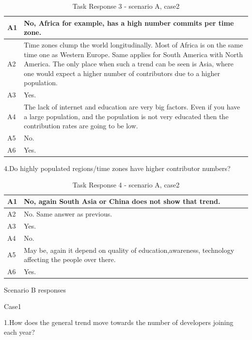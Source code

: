 \documentclass[double,12pt]{beavtex}
\begin{document}
\begin{appendices}
\begin{table}[H]
\begin{tabular}{ |p{2cm}|p{12cm}| }
 \hline
 A1 & No, Africa for example, has a high number commits per time zone.\\
 \hline
 A2 & Time zones clump the world longitudinally. Most of Africa is on the same time one as Western Europe. Same applies for South America with North America. The only place when such a trend can be seen is Asia, where one would expect a higher number of contributors due to a higher population.\\ \hline
 A3 & Yes.\\ \hline
 A4 & The lack of internet and education are very big factors. Even if you have a large population, and the population is not very educated then the contribution rates are going to be low.\\ \hline
 A5 & No.\\ \hline
 A6 & Yes.\\
 \hline
\end{tabular}
\caption{Task Response 3 - scenario A, case2}
\label{tab:table13}
\end{table}

4.Do highly populated regions/time zones have higher contributor numbers?

\begin{table}[H]
\begin{tabular}{ |p{2cm}|p{12cm}| }
 \hline
 A1 & No, again South Asia or China does not show that trend.\\
 \hline
 A2 & No. Same answer as previous.\\ \hline
 A3 & Yes.\\ \hline
 A4 & No.\\ \hline
 A5 & May be, again it depend on quality of education,awareness, technology affecting the people over there.\\ \hline
 A6 & Yes.\\
 \hline
\end{tabular}
\caption{Task Response 4 - scenario A, case2}
\label{tab:table14}
\end{table}

Scenario B responses

Case1

1.How does the general trend move towards the number of developers joining each year?	


\end{appendices}
\end{document}
